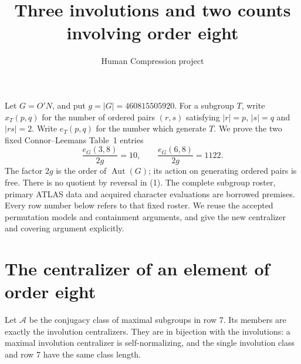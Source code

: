 \documentclass[11pt,a4paper]{article}
\title{Three involutions and two counts involving order eight}
\author{Human Compression project}\date{}
\begin{document}
\maketitle
Let $G=O'N$, and put $g=|G|=460815505920$. For a subgroup $T$, write
$x_T(p,q)$ for the number of ordered pairs $(r,s)$ satisfying
$|r|=p$, $|s|=q$ and $|rs|=2$. Write $e_T(p,q)$ for the number
which generate $T$. We prove the two fixed Connor--Leemans Table~1 entries
\[
 \frac{e_G(3,8)}{2g}=10,\qquad \frac{e_G(6,8)}{2g}=1122.       \tag{1}
\]
The factor $2g$ is the order of $\operatorname{Aut}(G)$; its action on
generating ordered pairs is free. There is no quotient by reversal in (1).
The complete subgroup roster, primary ATLAS data and acquired character
evaluations are borrowed premises. Every row number below refers to that
fixed roster. We reuse the accepted permutation models and containment
arguments, and give the new centralizer and covering argument explicitly.

\section*{The centralizer of an element of order eight}
Let $\mathcal A$ be the conjugacy class of maximal subgroups in row 7.
Its members are exactly the involution centralizers. They are in bijection
with the involutions: a maximal involution centralizer is self-normalizing,
and the single involution class and row 7 have the same class length.
\end{document}
